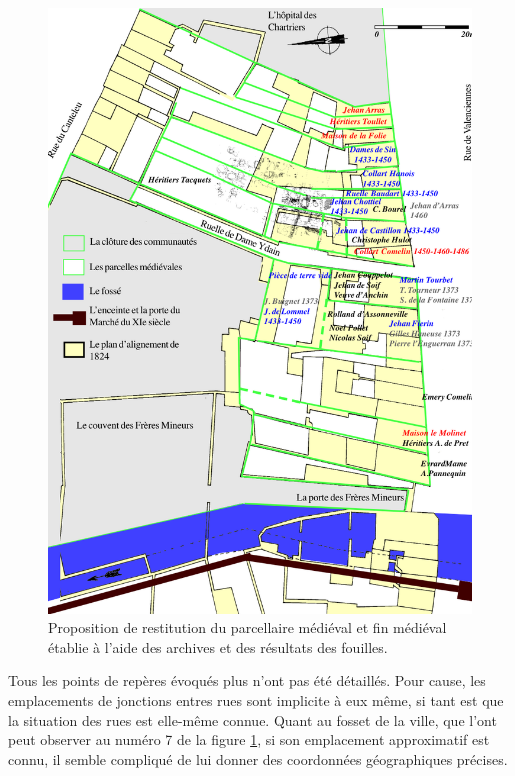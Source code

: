 \begin{figure}
    \centering
    \includegraphics[scale=0.80]{3.Results/Img/demolon99.png}
    \caption{Proposition de restitution du parcellaire médiéval et fin médiéval établie à l’aide des archives et des résultats des fouilles.}
    \label{fig:demolon99}
\end{figure}

Tous les points de repères évoqués plus n'ont pas été détaillés. Pour cause, les emplacements de jonctions entres rues  sont implicite à eux même, si tant est  que la situation des rues  est elle-même connue. 
Quant au fosset de la ville, que l'ont peut observer au numéro 7 de la figure \ref{fig:demolon99}, si son emplacement approximatif est connu, il semble compliqué de lui donner des coordonnées géographiques précises. 

